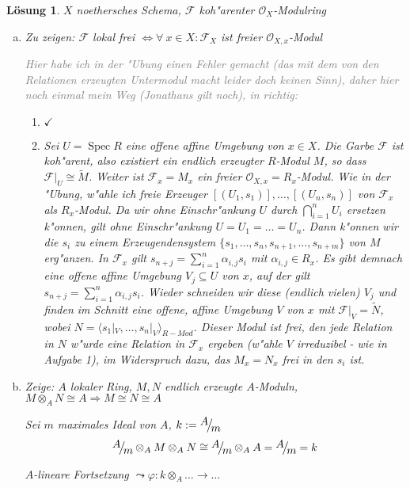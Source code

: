 \documentclass[paper = A4, fontsize=12pt, numbers=noendperiod, chapterprefix=true]{scrbook}
\theoremstyle{break}
\newtheorem{Loes}{L\"osung}
\theoremstyle{nonumberbreak}
\theoremstyle{nonumberplain}
\newcommand{\quot}[1]{\textrm{\glqq}{#1}\textrm{\grqq}}
\newenvironment{twosidedproof}{\begin{enumerate}[\quot{$\Rightarrow$}:]}{\end{enumerate}}
\newcommand{\proofforward}{\item[\quot{$\Rightarrow$}:]}
\newcommand{\proofreverse}{\item[\quot{$\Leftarrow$}:]}
\DeclareMathOperator{\Spec}{Spec}
\newcommand{\calF}{\mathcal{F}}
\newcommand{\calO}{\mathcal{O}}
\newcommand{\F}{\mathcal{F}} %
\newcommand{\FakRaum}[2]{
	\raisebox{0.7ex}{\ensuremath{#1}}
	\ensuremath{\mkern-3mu}\big/\ensuremath{\mkern-3mu}
	\raisebox{-0.6ex}{\ensuremath{#2}}}
\begin{document}
\begin{Loes}
$X$ noethersches Schema, $\calF$ koh"arenter $\calO_X$-Modulring
\begin{enumerate}[a)]
\item
	\emph{Zu zeigen:} $\calF$ lokal frei $\Leftrightarrow \forall \ x \in X: \calF_X$ ist freier $\calO_{X,x}$-Modul
	
	\textcolor{gray}{Hier habe ich in der "Ubung einen Fehler gemacht (das mit dem von den Relationen erzeugten Untermodul macht leider doch keinen Sinn), daher hier noch einmal mein Weg (Jonathans gilt noch), in richtig:}
	\begin{twosidedproof}
	\proofforward $\checkmark$
	\proofreverse
		Sei $U = \Spec R$ eine offene affine Umgebung von $x \in X$. Die Garbe $\F$ ist koh"arent, also existiert ein endlich erzeugter $R$-Modul $M$, so dass $\F|_U \cong \widetilde{M}$. Weiter ist $\F_x = M_x$ ein freier $\calO_{X,x} = R_x$-Modul. Wie in der "Ubung, w"ahle ich freie Erzeuger $[(U_1, s_1)], \dots, [(U_n,s_n)]$ von $\F_x$ als $R_x$-Modul. Da wir ohne Einschr"ankung $U$ durch $\bigcap_{i=1}^n U_i$ ersetzen k"onnen, gilt ohne Einschr"ankung $U = U_1 = \dots = U_n$. Dann k"onnen wir die $s_i$ zu einem Erzeugendensystem $\{s_1, \dots, s_n, s_{n+1}, \dots, s_{n+m}\}$ von $M$ erg"anzen. In $\F_x$ gilt 
 $s_{n+j} = \sum_{i=1}^n \alpha_{i,j} s_i$ mit $\alpha_{i,j} \in R_x$. Es gibt demnach eine offene affine Umgebung $V_j \subseteq U$ von $x$, auf der gilt $s_{n+j} = \sum_{i=1}^n \alpha_{i,j} s_i$. Wieder schneiden wir diese (endlich vielen) $V_j$ und finden im Schnitt eine offene, affine Umgebung $V$ von $x$ mit $\F|_V = \widetilde N$, wobei $N = \langle s_1|_V, \dots, s_n|_V \rangle _{R-Mod}$. Dieser Modul ist frei, den jede Relation in $N$ w"urde eine Relation in $\F_x$ ergeben (w"ahle $V$ irreduzibel - wie in Aufgabe 1), im Widerspruch dazu, das $M_x = N_x$ frei in den $s_i$ ist.
	\end{twosidedproof}
\item
	\emph{Zeige:} $A$ lokaler Ring, $M, N$ endlich erzeugte $A$-Moduln, $M \otimes_A N \cong A \Rightarrow M \cong N \cong A$
	
	Sei $m$ maximales Ideal von $A$, $k := \FakRaum{A}{m}$
		\[ \FakRaum{A}{m} \otimes_A M \otimes_A N \cong \FakRaum{A}{m} \otimes_A A = \FakRaum{A}{m} = k \]
	\begin{description}[\setlabelstyle{\itshape}]
	\item[Behauptung:] $k \otimes_A (M \otimes_A N) \cong (k \otimes_A M) \otimes_k (k \otimes_A N)$
	\item[Denn:] $a \otimes m \otimes n \mapsto (a \otimes m) \otimes (1 \otimes n)$
	\end{description}
	$A$-lineare Fortsetzung $\leadsto \varphi: k \otimes_A \ldots  \to \ldots $
	

\end{enumerate}
\end{Loes}
\end{document}
